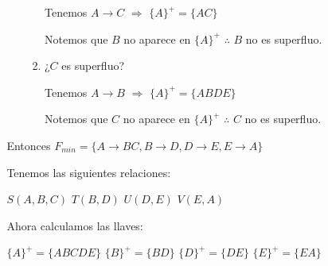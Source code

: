 \documentclass[12pt, letterpaper]{article}
\begin{document}
\begin{itemize}
\begin{itemize}
\begin{itemize}
\begin{itemize}
\begin{enumerate}
                                                                  Tenemos $A\rightarrow C$ $\Rightarrow$ $\{A\}^+=\{AC\}$ \vspace{.1cm}

                                                                  Notemos que $B$ no aparece en $\{A\}^+$ $\therefore$ $B$ no es superfluo. \vspace{.2cm}

                                                          \item[] ¿$C$ es superfluo? \vspace{.1cm}
                                                          
                                                                  Tenemos $A \rightarrow B$ $\Rightarrow$ $\{A\}^+=\{ABDE\}$ \vspace{.1cm}

                                                                  Notemos que $C$ no aparece en $\{A\}^+$ $\therefore$ $C$ no es superfluo.
                                                            
                                                      \end{enumerate}

                                        \end{itemize}\vspace{.3cm}
                                    
                                    Entonces $F_{min}=\{A\rightarrow BC,B\rightarrow D, D\rightarrow E,E\rightarrow A\}$ \vspace{.3cm}

                                    Tenemos las siguientes relaciones: \vspace{.1cm}

                                    $S(A,B,C)$ \hspace{.5cm} $T(B,D)$ \hspace{.5cm} $U(D,E)$ \hspace{.5cm} $V(E,A)$ \vspace{.3cm}

                                    Ahora calculamos las llaves:\vspace{.1cm}

                                    $\{A\}^+=\{ABCDE\}$ \hspace{.5cm} $\{B\}^+=\{BD\}$ \hspace{.5cm} $\{D\}^+=\{DE\}$ \hspace{.5cm} $\{E\}^+=\{EA\}$ \vspace{.1cm}


\end{itemize}
\end{itemize}
\end{itemize}
\end{document}
